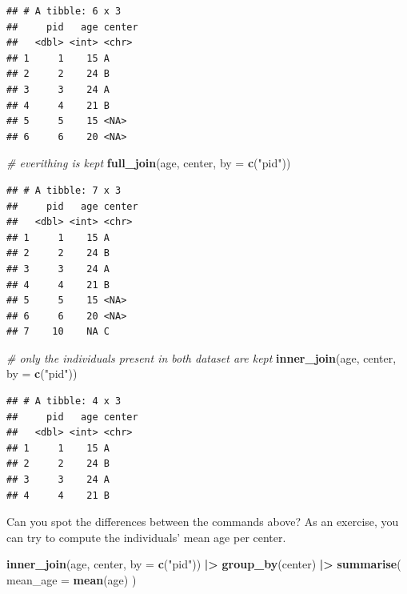 \documentclass[
]{book}
\newenvironment{Shaded}{\begin{snugshade}}{\end{snugshade}}
\newcommand{\AttributeTok}[1]{\textcolor[rgb]{0.13,0.29,0.53}{#1}}
\newcommand{\CommentTok}[1]{\textcolor[rgb]{0.56,0.35,0.01}{\textit{#1}}}
\newcommand{\FunctionTok}[1]{\textcolor[rgb]{0.13,0.29,0.53}{\textbf{#1}}}
\newcommand{\NormalTok}[1]{#1}
\newcommand{\SpecialCharTok}[1]{\textcolor[rgb]{0.81,0.36,0.00}{\textbf{#1}}}
\newcommand{\StringTok}[1]{\textcolor[rgb]{0.31,0.60,0.02}{#1}}
\begin{document}
\begin{verbatim}
## # A tibble: 6 x 3
##     pid   age center
##   <dbl> <int> <chr> 
## 1     1    15 A     
## 2     2    24 B     
## 3     3    24 A     
## 4     4    21 B     
## 5     5    15 <NA>  
## 6     6    20 <NA>
\end{verbatim}

\begin{Shaded}
\begin{Highlighting}[]
\CommentTok{\# everithing is kept}
\FunctionTok{full\_join}\NormalTok{(age, center, }\AttributeTok{by =} \FunctionTok{c}\NormalTok{(}\StringTok{"pid"}\NormalTok{))}
\end{Highlighting}
\end{Shaded}

\begin{verbatim}
## # A tibble: 7 x 3
##     pid   age center
##   <dbl> <int> <chr> 
## 1     1    15 A     
## 2     2    24 B     
## 3     3    24 A     
## 4     4    21 B     
## 5     5    15 <NA>  
## 6     6    20 <NA>  
## 7    10    NA C
\end{verbatim}

\begin{Shaded}
\begin{Highlighting}[]
\CommentTok{\# only the individuals present in both dataset are kept}
\FunctionTok{inner\_join}\NormalTok{(age, center, }\AttributeTok{by =} \FunctionTok{c}\NormalTok{(}\StringTok{"pid"}\NormalTok{))}
\end{Highlighting}
\end{Shaded}

\begin{verbatim}
## # A tibble: 4 x 3
##     pid   age center
##   <dbl> <int> <chr> 
## 1     1    15 A     
## 2     2    24 B     
## 3     3    24 A     
## 4     4    21 B
\end{verbatim}

Can you spot the differences between the commands above?
As an exercise, you can try to compute the individuals' mean age per center.

\begin{Shaded}
\begin{Highlighting}[]
\FunctionTok{inner\_join}\NormalTok{(age, center, }\AttributeTok{by =} \FunctionTok{c}\NormalTok{(}\StringTok{"pid"}\NormalTok{)) }\SpecialCharTok{|\textgreater{}}
  \FunctionTok{group\_by}\NormalTok{(center) }\SpecialCharTok{|\textgreater{}}
  \FunctionTok{summarise}\NormalTok{(}
    \AttributeTok{mean\_age =} \FunctionTok{mean}\NormalTok{(age)}
\NormalTok{  )}
\end{Highlighting}
\end{Shaded}
\end{document}
